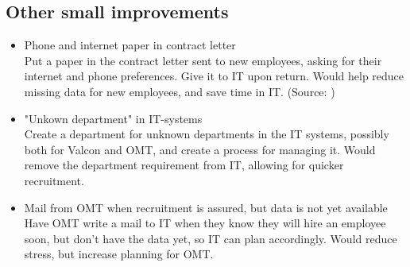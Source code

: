 \subsection{Other small improvements}
\begin{itemize}
	\item Phone and internet paper in contract letter\\
	
			Put a paper in the contract letter sent to new employees, asking for their internet and phone preferences. Give it to IT upon return. Would help reduce missing data for new employees, and save time in IT.
			(Source: )			
	
	\item "Unkown department" in IT-systems\\
	
			Create a department for unknown departments in the IT systems, possibly both for Valcon and OMT, and create a process for managing it.
			Would remove the department requirement from IT, allowing for quicker recruitment.
			
	\item Mail from OMT when recruitment is assured, but data is not yet available\\
	
			Have OMT write a mail to IT when they know they will hire an employee soon, but don't have the data yet, so IT can plan accordingly.
			Would reduce stress, but increase planning for OMT.
\end{itemize}
